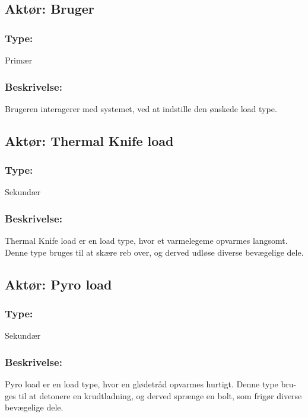 \begin{framed}
	\subsection{Aktør: Bruger}
	\subsubsection*{Type:}
		Primær
	
	\subsubsection*{Beskrivelse:}
		Brugeren interagerer med systemet, ved at indstille den ønskede load type.
\end{framed}

\begin{framed}
	\subsection{Aktør: Thermal Knife load}
	\subsubsection*{Type:}
	Sekundær
	
	\subsubsection*{Beskrivelse:}
	Thermal Knife load er en load type, hvor et varmelegeme opvarmes langsomt. \indent Denne type bruges til at skære reb over, og derved udløse diverse bevægelige \indent dele.
\end{framed}

\begin{framed}
	\subsection{Aktør: Pyro load}
	\subsubsection*{Type:}
	Sekundær
	
	\subsubsection*{Beskrivelse:}
	Pyro load er en load type, hvor en glødetråd opvarmes hurtigt. Denne type bru- \indent ges til at detonere en krudtladning, og derved sprænge en bolt, som frigør diverse \indent bevægelige dele.
\end{framed}


